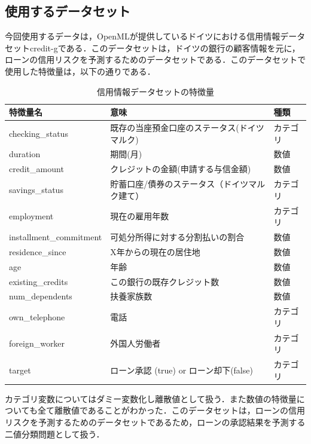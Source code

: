 \subsection{使用するデータセット}
今回使用するデータは，OpenMLが提供しているドイツにおける信用情報データセットcredit-gである．このデータセットは，ドイツの銀行の顧客情報を元に，ローンの信用リスクを予測するためのデータセットである．このデータセットで使用した特徴量は，以下の通りである．

\begin{table}[H]
    \centering
    \caption{信用情報データセットの特徴量}
    \begin{tabular}{|l|l|l|}
        \hline
        特徴量名 & 意味 & 種類 \\ \hline
        checking\_status & 既存の当座預金口座のステータス(ドイツマルク) & カテゴリ \\ \hline
        duration & 期間(月) & 数値 \\ \hline
        credit\_amount & クレジットの金額(申請する与信金額) & 数値 \\ \hline
        savings\_status & 貯蓄口座/債券のステータス（ドイツマルク建て） & カテゴリ \\ \hline
        employment & 現在の雇用年数 & カテゴリ \\ \hline
        installment\_commitment & 可処分所得に対する分割払いの割合 & 数値 \\ \hline
        residence\_since & X年からの現在の居住地 & 数値 \\ \hline
        age & 年齢 & 数値 \\ \hline
        existing\_credits & この銀行の既存クレジット数 & 数値 \\ \hline
        num\_dependents & 扶養家族数 & 数値 \\ \hline
        own\_telephone & 電話 & カテゴリ \\ \hline
        foreign\_worker & 外国人労働者 & カテゴリ \\ \hline
        target & ローン承認 (true) or ローン却下(false) & カテゴリ \\ \hline
    \end{tabular}
    \label{tab:credit_g_features}
\end{table}

カテゴリ変数についてはダミー変数化し離散値として扱う．また数値の特徴量についても全て離散値であることがわかった．このデータセットは，ローンの信用リスクを予測するためのデータセットであるため，ローンの承認結果を予測する二値分類問題として扱う．